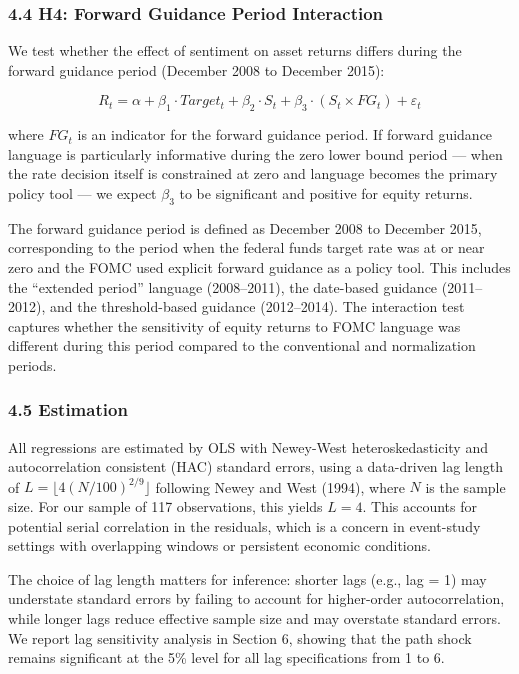 \documentclass[12pt]{article}
\begin{document}
\subsubsection{4.4 H4: Forward Guidance Period
Interaction}\label{h4-forward-guidance-period-interaction}

We test whether the effect of sentiment on asset returns differs during
the forward guidance period (December 2008 to December 2015):

\[R_t = \alpha + \beta_1 \cdot Target_t + \beta_2 \cdot S_t + \beta_3 \cdot (S_t \times FG_t) + \varepsilon_t\]

where \(FG_t\) is an indicator for the forward guidance period. If
forward guidance language is particularly informative during the zero
lower bound period --- when the rate decision itself is constrained at
zero and language becomes the primary policy tool --- we expect
\(\beta_3\) to be significant and positive for equity returns.

The forward guidance period is defined as December 2008 to December
2015, corresponding to the period when the federal funds target rate was
at or near zero and the FOMC used explicit forward guidance as a policy
tool. This includes the ``extended period'' language (2008--2011), the
date-based guidance (2011--2012), and the threshold-based guidance
(2012--2014). The interaction test captures whether the sensitivity of
equity returns to FOMC language was different during this period
compared to the conventional and normalization periods.

\subsubsection{4.5 Estimation}\label{estimation}

All regressions are estimated by OLS with Newey-West heteroskedasticity
and autocorrelation consistent (HAC) standard errors, using a
data-driven lag length of \(L = \lfloor 4(N/100)^{2/9} \rfloor\)
following Newey and West (1994), where \(N\) is the sample size. For our
sample of 117 observations, this yields \(L = 4\). This accounts for
potential serial correlation in the residuals, which is a concern in
event-study settings with overlapping windows or persistent economic
conditions.

The choice of lag length matters for inference: shorter lags (e.g., lag
= 1) may understate standard errors by failing to account for
higher-order autocorrelation, while longer lags reduce effective sample
size and may overstate standard errors. We report lag sensitivity
analysis in Section 6, showing that the path shock remains significant
at the 5\% level for all lag specifications from 1 to 6.
\end{document}

